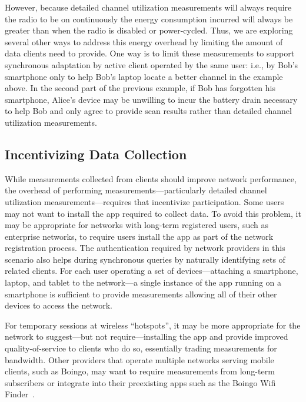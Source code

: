 However, because detailed channel utilization measurements will always
require the radio to be on continuously the energy consumption incurred will
always be greater than when the radio is disabled or power-cycled. Thus, we
are exploring several other ways to address this energy overhead by limiting
the amount of data clients need to provide. One way is to limit these
measurements to support synchronous adaptation by active client operated by
the same user: i.e., by Bob's smartphone only to help Bob's laptop locate a
better channel in the example above. In the second part of the previous
example, if Bob has forgotten his smartphone, Alice's device may be unwilling
to incur the battery drain necessary to help Bob and only agree to provide
scan results rather than detailed channel utilization measurements.

\subsection{Incentivizing Data Collection}

While measurements collected from \PS{} clients should improve network
performance, the overhead of performing measurements---particularly detailed
channel utilization measurements---requires that \PS{} incentivize
participation. Some users may not want to install the \PS{} app required to
collect data. To avoid this problem, it may be appropriate for \PS{} networks
with long-term registered users, such as enterprise networks, to require
users install the \PS{} app as part of the network registration process. The
authentication required by network providers in this scenario also helps
during synchronous queries by naturally identifying sets of related clients.
For each user operating a set of devices---attaching a smartphone, laptop,
and tablet to the \PS{} network---a single instance of the \PS{} app running
on a smartphone is sufficient to provide measurements allowing all of their
other devices to access the network.

For temporary sessions at wireless ``hotspots'', it may be more appropriate
for the network to suggest---but not require---installing the \PS{} app and
provide improved quality-of-service to clients who do so, essentially trading
measurements for bandwidth. Other providers that operate multiple networks
serving mobile clients, such as Boingo, may want to require measurements from
long-term subscribers or integrate \PS{} into their preexisting apps such as
the Boingo Wifi Finder~\cite{boingo-playstore-url}.

